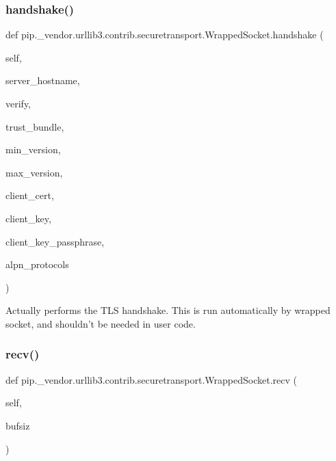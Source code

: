 \subsubsection{\texorpdfstring{handshake()}{handshake()}}
{\footnotesize\ttfamily def pip.\+\_\+vendor.\+urllib3.\+contrib.\+securetransport.\+Wrapped\+Socket.\+handshake (\begin{DoxyParamCaption}\item[{}]{self,  }\item[{}]{server\+\_\+hostname,  }\item[{}]{verify,  }\item[{}]{trust\+\_\+bundle,  }\item[{}]{min\+\_\+version,  }\item[{}]{max\+\_\+version,  }\item[{}]{client\+\_\+cert,  }\item[{}]{client\+\_\+key,  }\item[{}]{client\+\_\+key\+\_\+passphrase,  }\item[{}]{alpn\+\_\+protocols }\end{DoxyParamCaption})}

\begin{DoxyVerb}Actually performs the TLS handshake. This is run automatically by
wrapped socket, and shouldn't be needed in user code.
\end{DoxyVerb}
 \mbox{\label{classpip_1_1__vendor_1_1urllib3_1_1contrib_1_1securetransport_1_1WrappedSocket_a3832e7a008b3a38b6b9abc8941f7e062}} 
\subsubsection{\texorpdfstring{recv()}{recv()}}
{\footnotesize\ttfamily def pip.\+\_\+vendor.\+urllib3.\+contrib.\+securetransport.\+Wrapped\+Socket.\+recv (\begin{DoxyParamCaption}\item[{}]{self,  }\item[{}]{bufsiz }\end{DoxyParamCaption})}

